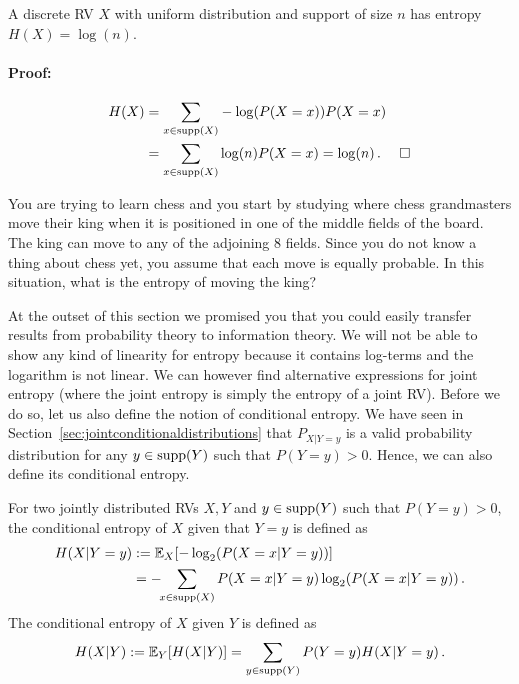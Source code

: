 \begin{Theorem}
A discrete RV $ X $ with uniform distribution and support of size $ n $ has entropy
$ H(X) = \log(n) $.
\end{Theorem}

\paragraph{Proof:}
\begin{align}
H(X) &= \underset{x \in \operatorname{supp}(X)}{\sum}-\log(P(X=x))P(X=x) \\
&= \underset{x \in \operatorname{supp}(X)}{\sum}\log(n)P(X=x) = \log(n) \, . ~~~~\square
\end{align}

\begin{Exercise}
You are trying to learn chess and you start by studying where chess grandmasters move their king when it
is positioned in one of the middle fields of the board. The king can move to any of the adjoining 8 fields. Since
you do not know a thing about chess yet, you assume that each move is equally probable. In this situation,
what is the entropy of moving the king?
\end{Exercise}

At the outset of this section we promised you that you could easily transfer results from probability 
theory to information theory. We will not be able to show any kind of linearity for entropy because it contains
log-terms and the logarithm is not linear. We can however find alternative expressions for joint entropy (where 
the joint entropy is simply the entropy of a joint RV). Before we do so, let us also define the notion of 
conditional entropy. We have seen in Section~\ref{sec:jointconditionaldistributions} that $P_{X|Y=y}$ is a valid probability distribution for any $y \in \operatorname{supp}(Y)$ such that $P(Y=y)>0$. Hence, we can also define its conditional entropy.

\begin{Definition}
For two jointly distributed RVs $ X,Y $ and $y \in \operatorname{supp}(Y)$ such that $P(Y=y)>0$, the conditional entropy of $ X $ given that $ Y=y $ is defined as
\begin{align*}
H(X|Y=y) &:= \mathbb{E}_X[-\log_{2}(P(X=x|Y=y))] \\
&= - \!\! \sum_{x \in \operatorname{supp}(X)} P(X=x|Y=y) \log_2(P(X=x|Y=y))\, . 
\end{align*}
The conditional entropy of $X$ given $Y$ is defined as
$$ H(X|Y) := \mathbb{E}_Y[ H(X|Y) ] = \sum_{y \in \operatorname{supp}(Y)} P(Y=y) H(X|Y=y) \, .$$
\end{Definition}

